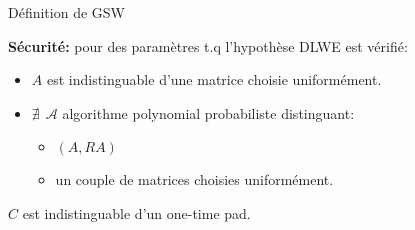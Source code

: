 \documentclass[10pt,xcolor={usenames,dvipsnames}]{beamer}
\begin{document}
\begin{section}{Définition de GSW}
\begin{frame}
\textbf{Sécurité:} pour des paramètres t.q l'hypothèse DLWE est vérifié:\\
\begin{itemize}
\item $A$ est indistinguable d'une matrice choisie uniformément. 
\item $\nexists\:\: \mathcal{A}$ algorithme polynomial probabiliste distinguant:
	\begin{itemize}
	\item $(A,RA)$ 
	\item un couple de matrices choisies uniformément.
	\end{itemize}
\end{itemize}

$C$ est indistinguable d'un one-time pad.
\end{frame} 


\end{section}
\end{document}

